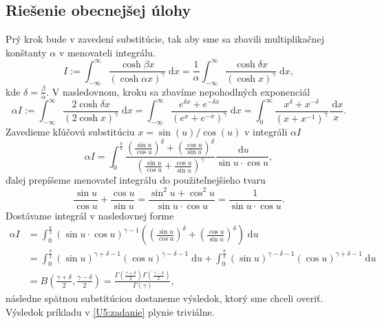 \documentclass[10pt,a4paper]{article}
\newcommand{\const}[1]{\text{#1}}
\renewcommand{\d}[1]{\;\const{d}#1}
\begin{document}
\subsection{Riešenie obecnejšej úlohy}
Prý krok bude v zavedení substitúcie, tak aby sme sa zbavili multiplikačnej konštanty $\alpha$ v menovateli integrálu. 
\begin{equation}
    I:= \int_{-\infty}^{\infty} \frac{\cosh \beta x}{(\cosh \alpha x)^{\gamma}} \d x=\frac{1}{\alpha}\int_{-\infty}^{\infty} \frac{\cosh \delta x}{(\cosh x)^{\gamma}} \d x,
\end{equation}
kde $\delta=\frac{\beta}{\alpha}$. V nasledovnom, kroku sa zbavíme nepohodlných exponenciál
\begin{equation}
\alpha I:=
\int_{-\infty}^{\infty} \frac{2 \cosh \delta x}{(2 \cosh x)^{\gamma}} \d x=
\int_{-\infty}^{\infty} \frac{e^{\delta x}+e^{-\delta x}}{\left(e^{x}+e^{-x}\right)^{\gamma}} \d x=
\int_{0}^{\infty} \frac{x^{\delta}+x^{-\delta}}{\left(x+x^{-1}\right)^{\gamma}} \frac{\d x}{x}.
\end{equation}
Zavedieme kľúčovú substitúciu $x=\sin(u)/\cos(u)$ v integráli $\alpha I$
\begin{equation}
\alpha I = \int_{0}^{\frac{\pi}{2}} \frac{\left(\frac{\sin u}{\cos u}\right)^{\delta}+\left(\frac{\cos u}{\sin u}\right)^{\delta}}{\left(\frac{\sin u}{\cos u}+\frac{\cos u}{\sin u}\right)^{\gamma}} \frac{\d u}{\sin u \cdot \cos u},
\end{equation}
ďalej prepíšeme menovateľ integrálu do použiteľnejšieho tvaru 
\begin{equation}
\frac{\sin u}{\cos u}+\frac{\cos u}{\sin u}=\frac{\sin ^{2} u+\cos ^{2} u}{\sin u \cdot \cos u}=\frac{1}{\sin u \cdot \cos u}.
\end{equation}
Dostávame integrál v nasledovnej forme
\begin{equation}
    \begin{aligned}
\alpha I&=\int_{0}^{\frac{\pi}{2}}(\sin u \cdot \cos u)^{\gamma-1}\left(\left(\frac{\sin u}{\cos u}\right)^{\delta}+\left(\frac{\cos u}{\sin u}\right)^{\delta}\right) \d u \\
&=\int_{0}^{\frac{\pi}{2}}(\sin u)^{\gamma+\delta-1}(\cos u)^{\gamma-\delta-1} \d u+\int_{0}^{\frac{\pi}{2}}(\sin u)^{\gamma-\delta-1}(\cos u)^{\gamma+\delta-1} \d u \\
&=B\left(\frac{\gamma+\delta}{2}, \frac{\gamma-\delta}{2}\right)=\frac{\Gamma\left(\frac{\gamma+\delta}{2}\right) \Gamma\left(\frac{\gamma-\delta}{2}\right)}{\Gamma(\gamma)},
    \end{aligned}
\end{equation}
následne spätnou substitúciou dostaneme výsledok, ktorý sme chceli overiť. Výsledok príkladu v \ref{U5:zadanie} plynie triviálne.
\pagebreak
\end{document}
